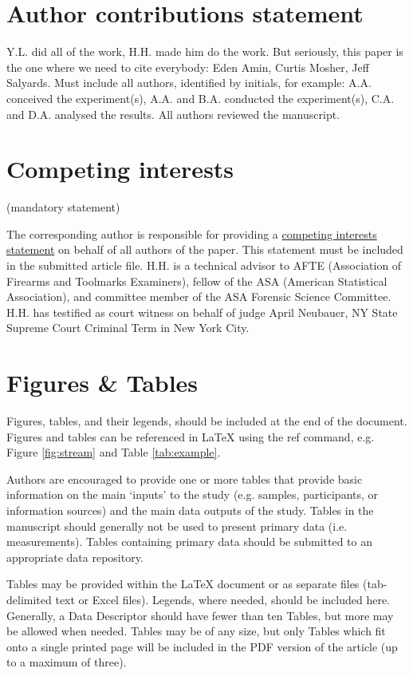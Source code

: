 \documentclass[fleqn,10pt]{wlscirep}
\begin{document}
\section*{Author contributions statement}

Y.L. did all of the work, H.H. made him do the work. But seriously, this
paper is the one where we need to cite everybody: Eden Amin, Curtis
Mosher, Jeff Salyards.
Must include all authors, identified by initials, for example:
A.A. conceived the experiment(s), A.A. and B.A. conducted the experiment(s), C.A. and D.A. analysed the results. All authors reviewed the manuscript. 

\section*{Competing interests} (mandatory statement)

The corresponding author is responsible for providing a
\href{https://www.nature.com/sdata/policies/editorial-and-publishing-policies#competing}{competing interests statement}
on behalf of all authors of the paper. This statement must be included
in the submitted article file. H.H. is a technical advisor to AFTE
(Association of Firearms and Toolmarks Examiners), fellow of the ASA
(American Statistical Association), and committee member of the ASA
Forensic Science Committee. H.H. has testified as court witness on
behalf of judge April Neubauer, NY State Supreme Court Criminal Term in
New York City.

\section*{Figures \& Tables}


Figures, tables, and their legends, should be included at the end of the document. Figures and tables can be referenced in \LaTeX{} using the ref command, e.g. Figure \ref{fig:stream} and Table \ref{tab:example}. 

Authors are encouraged to provide one or more tables that provide basic information on the main ‘inputs’ to the study (e.g. samples, participants, or information sources) and the main data outputs of the study. Tables in the manuscript should generally not be used to present primary data (i.e. measurements). Tables containing primary data should be submitted to an appropriate data repository.

Tables may be provided within the \LaTeX{} document or as separate files (tab-delimited text or Excel files). Legends, where needed, should be included here. Generally, a Data Descriptor should have fewer than ten Tables, but more may be allowed when needed. Tables may be of any size, but only Tables which fit onto a single printed page will be included in the PDF version of the article (up to a maximum of three). 
\end{document}
